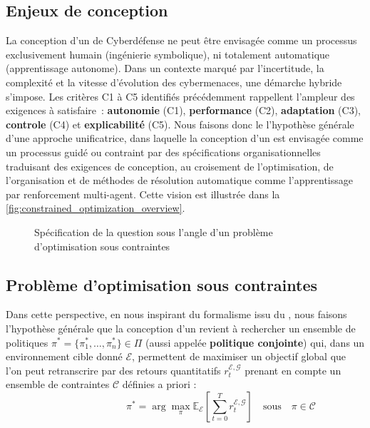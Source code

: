 \subsection{Enjeux de conception}

La conception d'un  de Cyberdéfense ne peut être envisagée comme un processus exclusivement humain (ingénierie symbolique), ni totalement automatique (apprentissage autonome). Dans un contexte marqué par l'incertitude, la complexité et la vitesse d'évolution des cybermenaces, une démarche hybride s'impose.
%
Les critères C1 à C5 identifiés précédemment rappellent l'ampleur des exigences à satisfaire~: \textbf{autonomie} (C1), \textbf{performance} (C2), \textbf{adaptation} (C3), \textbf{controle} (C4) et \textbf{explicabilité} (C5).
%
Nous faisons donc le l'hypothèse générale d'une approche unificatrice, dans laquelle la conception d'un  est envisagée comme un processus guidé ou contraint par des spécifications organisationnelles traduisant des exigences de conception, au croisement de l'optimisation, de l'organisation et de méthodes de résolution automatique comme l'apprentissage par renforcement multi-agent. Cette vision est illustrée dans la \autoref{fig:constrained_optimization_overview}.

\begin{figure}[h!]
  \centering
  \resizebox{\textwidth}{!}{%
    
  }
  \caption{Spécification de la question sous l'angle d'un problème d'optimisation sous contraintes}
  \label{fig:constrained_optimization_overview}
\end{figure}

\subsection{Problème d'optimisation sous contraintes}

Dans cette perspective, en nous inspirant du formalisme issu du , nous faisons l'hypothèse générale que la conception d'un  revient à rechercher un ensemble de politiques $\pi^* = \{\pi^*_1, \dots, \pi^*_n\} \in \Pi$ (aussi appelée \textbf{politique conjointe}) qui, dans un environnement cible donné $\mathcal{E}$, permettent de maximiser un objectif global que l'on peut retranscrire par des retours quantitatifs $r^{\mathcal{E}, \mathcal{G}}_t$ prenant en compte un ensemble de contraintes $\mathcal{C}$ définies a priori :
%
\[
  \hspace{3cm}\pi^* = \arg\max_{\pi} \mathbb{E}_{\mathcal{E}} \left[ \sum_{t=0}^{T} r^{\mathcal{E}, \mathcal{G}}_t \right] \quad \text{sous} \quad \pi \in \mathcal{C}
\]

